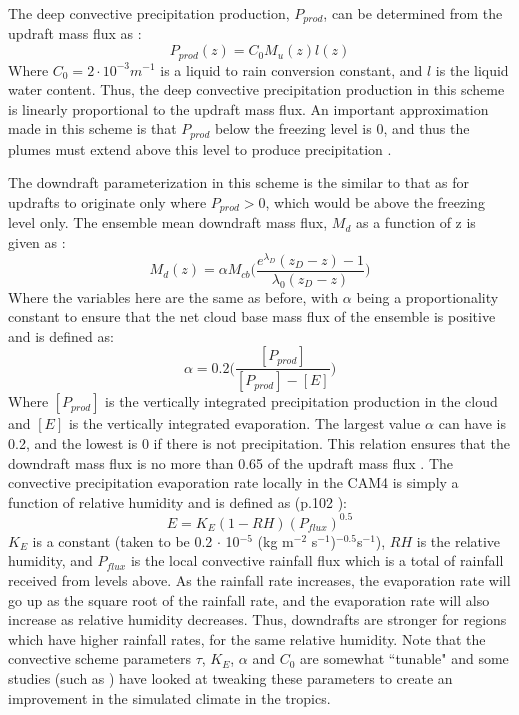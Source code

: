 \documentclass[letterpaper,12pt,titlepage,oneside,final]{book}
\begin{document}
The deep convective precipitation production, $P_{prod}$, can be determined from the updraft mass flux as \citep{zhang_sensitivity_1995}:
\begin{equation}\label{eq:pprod}
P_{prod}(z)=C_{0}M_{u}(z)l(z)
\end{equation}
Where $C_{0}=2\cdot{10^{-3}} m^{-1}$ is a liquid to rain conversion constant, and $l$ is the liquid water content. Thus, the deep convective precipitation production in this scheme is linearly proportional to the updraft mass flux. An important approximation made in this scheme is that $P_{prod}$ below the freezing level is 0, and thus the plumes must extend above this level to produce precipitation \citep{zhang_sensitivity_1995}.

The downdraft parameterization in this scheme is the similar to that as for updrafts to originate only where $P_{prod} > 0$, which would be above the freezing level only. The ensemble mean downdraft mass flux, $M_{d}$ as a function of z is given as \citep{zhang_sensitivity_1995}:
\begin{equation}\label{eq:down}
M_{d}(z)=\alpha{M_{cb}}\Bigg(\frac{e^{\lambda_{D}}(z_{D}-z)-1}{\lambda_{0}(z_{D}-z)}\Bigg)
\end{equation}
Where the variables here are the same as before, with $\alpha$ being a proportionality constant to ensure that the net cloud base mass flux of the ensemble is positive and is defined as:
\begin{equation}
\alpha=0.2\Bigg(\frac{[P_{prod}]}{[P_{prod}]-[E]}\Bigg)
\end{equation}
Where $[P_{prod}]$ is the vertically integrated precipitation production in the cloud and $[E]$ is the vertically integrated evaporation. The largest value $\alpha$ can have is 0.2, and the lowest is 0 if there is not precipitation. This relation ensures that the downdraft mass flux is no more than 0.65 of the updraft mass flux \citep{zhang_sensitivity_1995}. The convective precipitation evaporation rate locally in the CAM4 is simply a function of relative humidity and is defined as (p.102 \cite{neale_description_2010}):
\begin{equation}\label{eq:evap}
E=K_{E}(1-RH)(P_{flux})^{0.5}
\end{equation}
$K_{E}$ is a constant (taken to be 0.2 $\cdot$ 10$^{-5}$ (kg m$^{-2}$ s$^{-1}$)$^{-0.5}$s$^{-1}$), $RH$ is the relative humidity, and $P_{flux}$ is the local convective rainfall flux which is a total of rainfall received from levels above. As the rainfall rate increases, the evaporation rate will go up as the square root of the rainfall rate, and the evaporation rate will also increase as relative humidity decreases. Thus, downdrafts are stronger for regions which have higher rainfall rates, for the same relative humidity. Note that the convective scheme parameters $\tau$, $K_{E}$, $\alpha$ and $C_{0}$ are somewhat ``tunable" and some studies (such as \cite{yang_uncertainty_2013}) have looked at tweaking these parameters to create an improvement in the simulated climate in the tropics.
\end{document}
